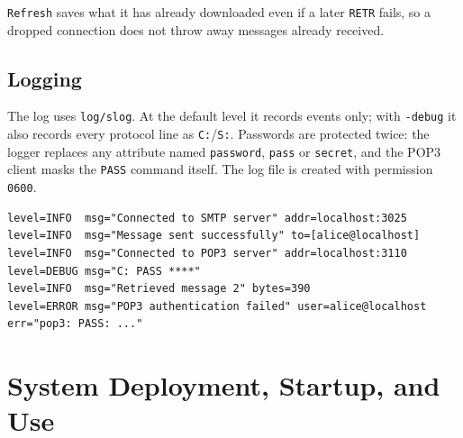 \documentclass[11pt,a4paper]{article}
\begin{document}
\texttt{Refresh} saves what it has already downloaded even if a later \texttt{RETR} fails,
so a dropped connection does not throw away messages already received.

\subsection{Logging}

The log uses \texttt{log/slog}. At the default level it records events only; with
\texttt{-debug} it also records every protocol line as \texttt{C:}/\texttt{S:}. Passwords are
protected twice: the logger replaces any attribute named \texttt{password}, \texttt{pass} or
\texttt{secret}, and the POP3 client masks the \texttt{PASS} command itself. The log file is
created with permission \texttt{0600}.

\begin{lstlisting}[style=wire]
level=INFO  msg="Connected to SMTP server" addr=localhost:3025
level=INFO  msg="Message sent successfully" to=[alice@localhost]
level=INFO  msg="Connected to POP3 server" addr=localhost:3110
level=DEBUG msg="C: PASS ****"
level=INFO  msg="Retrieved message 2" bytes=390
level=ERROR msg="POP3 authentication failed" user=alice@localhost err="pop3: PASS: ..."
\end{lstlisting}

\section{System Deployment, Startup, and Use}
\end{document}
